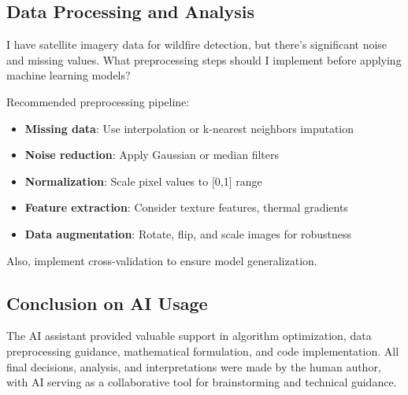 \subsection{Data Processing and Analysis}

\begin{tcolorbox}[title=\textbf{Question: Data preprocessing for wildfire detection}, colback=blue!2!white, colframe=blue!30!black, fonttitle=\bfseries, breakable]
I have satellite imagery data for wildfire detection, but there's significant noise and missing values. What preprocessing steps should I implement before applying machine learning models?
\end{tcolorbox}

\begin{tcolorbox}[title=\textbf{AI Response}, colback=green!2!white, colframe=green!30!black, fonttitle=\bfseries, breakable]
Recommended preprocessing pipeline:

\begin{itemize}
\item \textbf{Missing data}: Use interpolation or k-nearest neighbors imputation
\item \textbf{Noise reduction}: Apply Gaussian or median filters
\item \textbf{Normalization}: Scale pixel values to [0,1] range
\item \textbf{Feature extraction}: Consider texture features, thermal gradients
\item \textbf{Data augmentation}: Rotate, flip, and scale images for robustness
\end{itemize}

Also, implement cross-validation to ensure model generalization.
\end{tcolorbox}

\subsection{Conclusion on AI Usage}

The AI assistant provided valuable support in algorithm optimization, data preprocessing guidance, mathematical formulation, and code implementation. All final decisions, analysis, and interpretations were made by the human author, with AI serving as a collaborative tool for brainstorming and technical guidance.


\endinput
